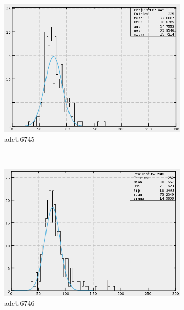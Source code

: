 \begin{figure}[h]
\begin{subfigure}[h]{0.3\textwidth}
        \includegraphics[width=\textwidth, keepaspectratio = true]{adcU67_45}
        \caption{adcU6745}
        \label{fig:adcU67_45}
    \end{subfigure}
    ~
    \begin{subfigure}[h]{0.3\textwidth}
        \centering
        \includegraphics[width=\textwidth, keepaspectratio = true]{adcU67_46}
        \caption{adcU6746}
        \label{fig:adcU67_46}
    \end{subfigure}
    \\
    \begin{subfigure}[h]{0.3\textwidth}
        \centering

\end{subfigure}
\end{figure}
